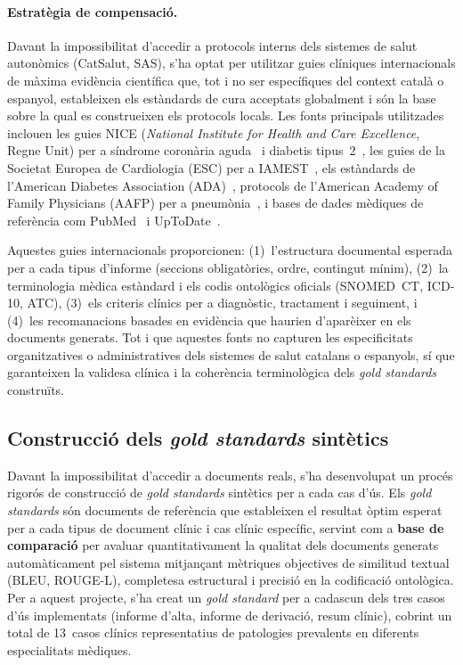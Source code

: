 \documentclass[CAT]{TFUOC}%
\begin{document}
\paragraph{Estratègia de compensació.}
Davant la impossibilitat d'accedir a protocols interns dels sistemes de salut autonòmics (CatSalut, SAS), s'ha optat per utilitzar guies clíniques internacionals de màxima evidència científica que, tot i no ser específiques del context català o espanyol, estableixen els estàndards de cura acceptats globalment i són la base sobre la qual es construeixen els protocols locals. Les fonts principals utilitzades inclouen les guies NICE (\textit{National Institute for Health and Care Excellence}, Regne Unit) per a síndrome coronària aguda~\cite{nice2020acs} i diabetis tipus~2~\cite{nice2015diabetes}, les guies de la Societat Europea de Cardiologia (ESC) per a IAMEST~\cite{esc2023stemi}, els estàndards de l'American Diabetes Association (ADA)~\cite{ada2023standards}, protocols de l'American Academy of Family Physicians (AAFP) per a pneumònia~\cite{aafp2022pneumonia}, i bases de dades mèdiques de referència com PubMed~\cite{pubmed2023clinical} i UpToDate~\cite{uptodate2023guidelines}.

Aquestes guies internacionals proporcionen: (1)~l'estructura documental esperada per a cada tipus d'informe (seccions obligatòries, ordre, contingut mínim), (2)~la terminologia mèdica estàndard i els codis ontològics oficials (SNOMED~CT, ICD-10, ATC), (3)~els criteris clínics per a diagnòstic, tractament i seguiment, i (4)~les recomanacions basades en evidència que haurien d'aparèixer en els documents generats. Tot i que aquestes fonts no capturen les especificitats organitzatives o administratives dels sistemes de salut catalans o espanyols, sí que garanteixen la validesa clínica i la coherència terminològica dels \textit{gold standards} construïts.

\subsection{Construcció dels \textit{gold standards} sintètics}

Davant la impossibilitat d'accedir a documents reals, s'ha desenvolupat un procés rigorós de construcció de \textit{gold standards} sintètics per a cada cas d'ús. Els \textit{gold standards} són documents de referència que estableixen el resultat òptim esperat per a cada tipus de document clínic i cas clínic específic, servint com a \textbf{base de comparació} per avaluar quantitativament la qualitat dels documents generats automàticament pel sistema mitjançant mètriques objectives de similitud textual (BLEU, ROUGE-L), completesa estructural i precisió en la codificació ontològica. Per a aquest projecte, s'ha creat un \textit{gold standard} per a cadascun dels tres casos d'ús implementats (informe d'alta, informe de derivació, resum clínic), cobrint un total de 13~casos clínics representatius de patologies prevalents en diferents especialitats mèdiques.
\end{document}
